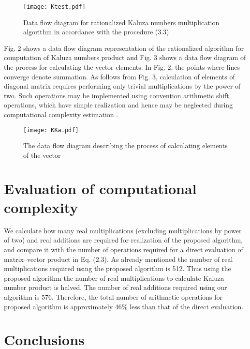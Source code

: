 \documentclass{jtacs}
\numberwithin{equation}{section}
\begin{document}
\begin{figure}[b!]
 \centering
  \texttt{[image: Ktest.pdf]}
  \caption{Data flow diagram for rationalized Kaluza numbers multiplication algorithm in accordance
with the procedure (3.3)}
  \label{fig2}
\end{figure}
\FloatBarrier

Fig. 2 shows a data flow diagram representation of the rationalized algorithm for computation
of Kaluza numbers product and Fig. 3 shows a data flow diagram of the process
for calculating the vector  elements. In Fig. 2, the points where lines converge denote
summation. As follows from Fig. 3, calculation of elements of diagonal matrix  requires
performing only trivial multiplications by the power of two. Such operations may be implemented using convention arithmetic shift operations, which have simple realization and hence may be neglected during computational complexity estimation \cite{24}.

\begin{figure}[hb]
 \centering
  \texttt{[image: KKa.pdf]}
  \caption{The data flow diagram describing the process of calculating elements of the vector  }
  \label{fig3}
\end{figure}
\FloatBarrier

\section{Evaluation of computational complexity}

We calculate how many real multiplications (excluding multiplications by power of two)
and real additions are required for realization of the proposed algorithm, and compare it
with the number of operations required for a direct evaluation of matrix–vector product in
Eq. (2.3). As already mentioned the number of real multiplications required using the proposed
algorithm is 512. Thus using the proposed algorithm the number of real multiplications
to calculate Kaluza number product is halved. The number of real additions required
using our algorithm is 576. Therefore, the total number of arithmetic operations for proposed
algorithm is approximately 46\% less than that of the direct evaluation.

\section{Conclusions}
\end{document}
